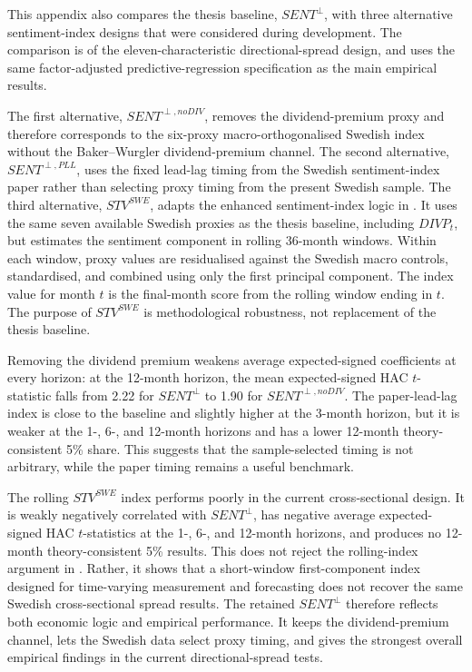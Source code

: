 \documentclass[11pt]{article}
\newcommand{\var}[1]{\ensuremath{#1}}
\begin{document}
This appendix also compares the thesis baseline, \var{SENT^{\perp}}, with three alternative sentiment-index designs that were considered during development. The comparison is of the eleven-characteristic directional-spread design, and uses the same factor-adjusted predictive-regression specification as the main empirical results.

The first alternative, \var{SENT^{\perp,noDIV}}, removes the dividend-premium proxy and therefore corresponds to the six-proxy macro-orthogonalised Swedish index without the Baker--Wurgler dividend-premium channel. The second alternative, \var{SENT^{\perp,PLL}}, uses the fixed lead-lag timing from the Swedish sentiment-index paper rather than selecting proxy timing from the present Swedish sample. The third alternative, \var{STV^{SWE}}, adapts the enhanced sentiment-index logic in \citet{ung2024enhanced}. It uses the same seven available Swedish proxies as the thesis baseline, including \var{DIVP_t}, but estimates the sentiment component in rolling 36-month windows. Within each window, proxy values are residualised against the Swedish macro controls, standardised, and combined using only the first principal component. The index value for month \(t\) is the final-month score from the rolling window ending in \(t\). The purpose of \var{STV^{SWE}} is methodological robustness, not replacement of the thesis baseline.



Removing the dividend premium weakens average expected-signed coefficients at every horizon: at the 12-month horizon, the mean expected-signed HAC \(t\)-statistic falls from 2.22 for \var{SENT^{\perp}} to 1.90 for \var{SENT^{\perp,noDIV}}. The paper-lead-lag index is close to the baseline and slightly higher at the 3-month horizon, but it is weaker at the 1-, 6-, and 12-month horizons and has a lower 12-month theory-consistent 5\% share. This suggests that the sample-selected timing is not arbitrary, while the paper timing remains a useful benchmark.

The rolling \var{STV^{SWE}} index performs poorly in the current cross-sectional design. It is weakly negatively correlated with \var{SENT^{\perp}}, has negative average expected-signed HAC \(t\)-statistics at the 1-, 6-, and 12-month horizons, and produces no 12-month theory-consistent 5\% results. This does not reject the rolling-index argument in \citet{ung2024enhanced}. Rather, it shows that a short-window first-component index designed for time-varying measurement and forecasting does not recover the same Swedish cross-sectional spread results. The retained \var{SENT^{\perp}} therefore reflects both economic logic and empirical performance. It keeps the dividend-premium channel, lets the Swedish data select proxy timing, and gives the strongest overall empirical findings in the current directional-spread tests.
\end{document}
